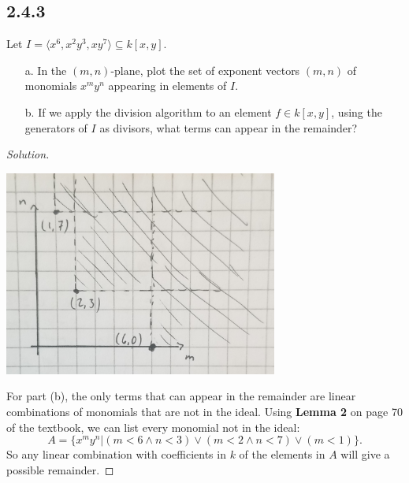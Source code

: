 \documentclass[]{article}
\newcommand\<{\langle}
\renewcommand\>{\rangle}
\newenvironment{solution}
{
	\begin{proof}[Solution] \text{ }
		\\
	}
	{
	\end{proof}
}
\begin{document}
\subsection*{2.4.3} Let $I = \<x^6, x^2y^3,xy^7\> \subseteq k[x,y].$
\begin{enumerate}
	\item[a.] In the $(m, n)\text{-plane}$, plot the set of exponent vectors $\left(m,n\right)$ of monomials $x^my^n$ appearing in elements of $I$.
	\item[b.] If we apply the division algorithm to an element $f \in k[x,y]$, using the generators of $I$ as divisors, what terms can appear in the remainder?
\end{enumerate}
\begin{solution}
	\begin{center}
		\includegraphics[width=9cm]{2-4-3-soln.jpg}
	\end{center}
	For part (b), the only terms that can appear in the remainder are linear combinations of monomials that are not in the ideal. Using \textbf{Lemma 2} on page 70 of the textbook, we can list every monomial not in the ideal:
	$$
		A = \{x^my^n | \left(m < 6 \land n < 3\right) \lor \left(m < 2 \land n < 7\right) \lor \left(m < 1\right)\}.
	$$
	So any linear combination with coefficients in $k$ of the elements in $A$ will give a possible remainder.
\end{solution}
\end{document}
